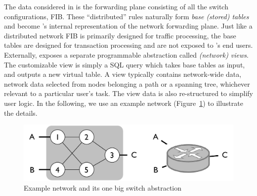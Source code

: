 The data considered in \Sys is the forwarding plane consisting of all
the switch configurations, \ie FIB.  These ``distributed'' rules
naturally form \Sys \textit{base (stored) tables} and become \Sys's
internal representation of the network forwarding plane. Just like a
distributed network FIB is primarily designed for traffic processing,
the base tables are designed for transaction processing and are not exposed
to \Sys's end users. Externally, \Sys exposes a separate programmable
abstraction called \textit{(network)
  views}.  %
The customizable view is simply a SQL query which takes base tables as
input, and outputs a new virtual table. A view typically
contains network-wide data, \eg network data selected from nodes
belonging a path or a spanning tree, whichever relevant to a
particular user's task. The view data is also re-structured to simplify
user logic. In the following, we use an example network
(Figure~\ref{fig:eg-one-big-switch}) to illustrate the details.

\vspace{-.5em}
\begin{figure}[ht!]
  \centering
  \includegraphics[width=.95\linewidth]{eg-one-big-switch.pdf}
  \caption{\footnotesize Example network and its one big switch
    abstraction}
  \label{fig:eg-one-big-switch}
\end{figure}
\vspace{-1em}

